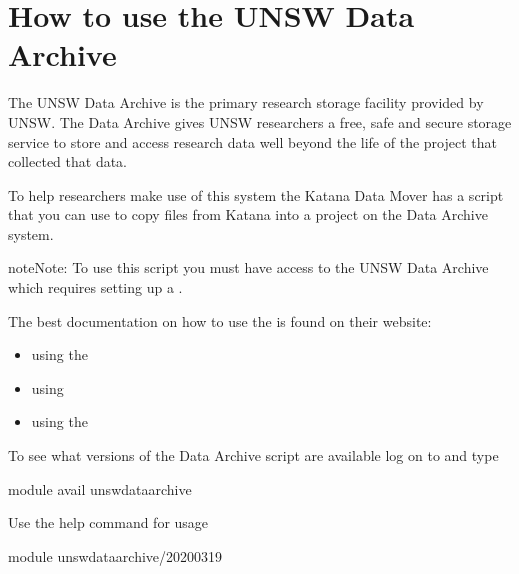 \documentclass[letterpaper,10pt,english]{sphinxmanual}
\begin{document}
\section{How to use the UNSW Data Archive}
\label{\detokenize{storage/data_archive:how-to-use-the-unsw-data-archive}}\label{\detokenize{storage/data_archive::doc}}
The UNSW Data Archive is the primary research storage facility provided by UNSW. The Data Archive gives UNSW researchers a free, safe and secure storage service to store and access research data well beyond the life of the project that collected that data.

To help researchers make use of this system the Katana Data Mover has a script that you can use to copy files from Katana into a project on the Data Archive system.

\begin{sphinxadmonition}{note}{Note:}
To use this script you must have access to the UNSW Data Archive which requires setting up a .
\end{sphinxadmonition}

The best documentation on how to use the  is found on their website:
\begin{itemize}
\item {} 
using the 

\item {} 
using 

\item {} 
using the 

\end{itemize}

To see what versions of the Data Archive script are available log on to  and type

\begin{sphinxVerbatim}[commandchars=\\\{\}]
module avail unswdataarchive
\end{sphinxVerbatim}

Use the help command for usage

\begin{sphinxVerbatim}[commandchars=\\\{\}]
module  unswdataarchive/2020\PYGZhy{}03\PYGZhy{}19
\end{sphinxVerbatim}
\end{document}
